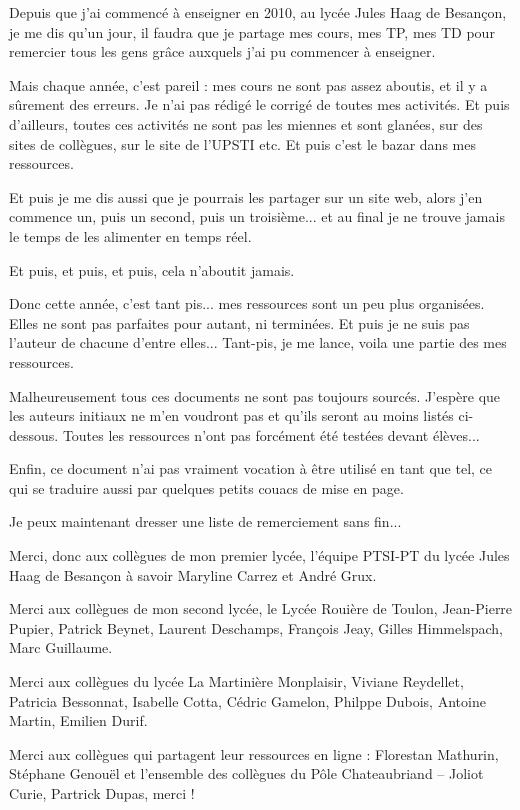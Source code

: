 Depuis que j'ai commencé à enseigner en 2010, au lycée Jules Haag de Besançon, je me dis qu'un jour, il faudra que je partage mes cours, mes TP, mes TD pour remercier tous les gens grâce auxquels j'ai pu commencer à enseigner. 

Mais chaque année, c'est pareil : mes cours ne sont pas assez aboutis, et il y a sûrement des erreurs. Je n'ai pas rédigé le corrigé de toutes mes activités. Et puis d'ailleurs, toutes ces activités ne sont pas les miennes et sont glanées, sur des sites de collègues, sur le site de l'UPSTI etc. Et puis c'est le bazar dans mes ressources. 

Et puis je me dis aussi que je pourrais les partager sur un site web, alors j'en commence un, puis un second, puis un troisième... et au final je ne trouve jamais le temps de les alimenter en temps réel. 

Et puis, et puis, et puis, cela n'aboutit jamais. 

Donc cette année, c'est tant pis... mes ressources sont un peu plus organisées. Elles ne sont pas parfaites pour autant, ni terminées. Et puis je ne suis pas l'auteur de chacune d'entre elles... Tant-pis, je me lance, voila une partie des mes ressources.

Malheureusement tous ces documents ne sont pas toujours sourcés. J'espère que les auteurs initiaux ne m'en voudront pas et qu'ils seront au moins listés ci-dessous. Toutes les ressources n'ont pas forcément été testées devant élèves...  

Enfin, ce document n'ai pas vraiment vocation à être utilisé en tant que tel, ce qui se traduire aussi par quelques petits couacs de mise en page.

Je peux maintenant dresser une liste de remerciement sans fin...

Merci, donc aux collègues de mon premier lycée, l'équipe PTSI-PT du lycée Jules Haag de Besançon à savoir Maryline Carrez et André Grux. 

Merci aux collègues de mon second lycée, le Lycée Rouière de Toulon, Jean-Pierre Pupier, Patrick Beynet, Laurent Deschamps, François Jeay, Gilles Himmelspach, Marc Guillaume.

Merci aux collègues du lycée La Martinière Monplaisir, Viviane Reydellet, Patricia Bessonnat, Isabelle Cotta, Cédric Gamelon, Philppe Dubois, Antoine Martin, Emilien Durif.

Merci aux collègues qui partagent leur ressources en ligne : Florestan Mathurin, Stéphane Genouël et l'ensemble des collègues du Pôle Chateaubriand -- Joliot Curie, Partrick Dupas, merci !

